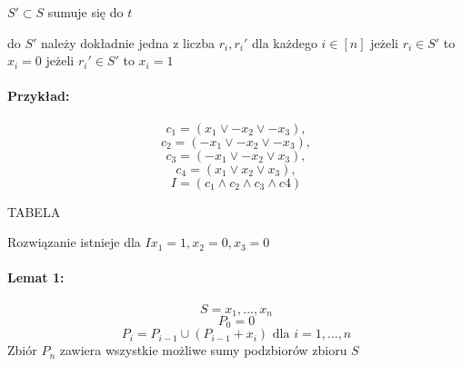 $S' \subset S$ sumuje się do $t$

do $S'$ należy dokładnie jedna z liczba $r_i, r_i'$ dla każdego $i \in [n]$
jeżeli $r_i  \in S'$ to $x_i = 0$
jeżeli $r_i' \in S'$ to $x_i = 1$

\paragraph{Przykład: }{
$$c_1=(x_1 \lor -x_2 \lor -x_3), $$
$$c_2=(-x_1 \lor -x_2 \lor -x_3),$$ 
$$c_3=(-x_1 \lor -x_2 \lor x_3), $$
$$c_4=(x_1 \lor x_2 \lor x_3),$$ 
$$I = (c_1 \land c_2 \land c_3 \land c4)$$
}

TABELA

Rozwiązanie istnieje dla $I  x_1=1 , x_2=0, x_3=0$

\paragraph{Lemat 1:}
$$S={x_1, ..., x_n}$$
$$P_0 = {0}$$
$$P_i = P_{i-1} \cup (P_{i-1} + x_i) \text{ dla } i=1, \ldots, n$$
Zbiór $P_n$ zawiera wszystkie możliwe sumy podzbiorów zbioru $S$

